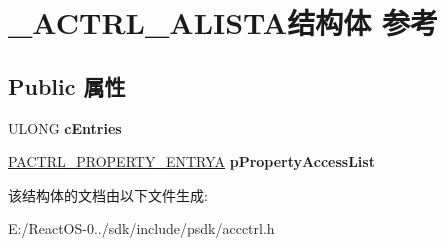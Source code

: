 \hypertarget{struct___a_c_t_r_l___a_l_i_s_t_a}{}\section{\+\_\+\+A\+C\+T\+R\+L\+\_\+\+A\+L\+I\+S\+T\+A结构体 参考}
\label{struct___a_c_t_r_l___a_l_i_s_t_a}
\subsection*{Public 属性}
\begin{DoxyCompactItemize}
\item 
\mbox{\label{struct___a_c_t_r_l___a_l_i_s_t_a_a98219313580ed691242f960f8d076cad}} 
U\+L\+O\+NG {\bfseries c\+Entries}
\item 
\mbox{\label{struct___a_c_t_r_l___a_l_i_s_t_a_a0926da45947604108cd636c1bd174a72}} 
\hyperlink{struct___a_c_t_r_l___p_r_o_p_e_r_t_y___e_n_t_r_y_a}{P\+A\+C\+T\+R\+L\+\_\+\+P\+R\+O\+P\+E\+R\+T\+Y\+\_\+\+E\+N\+T\+R\+YA} {\bfseries p\+Property\+Access\+List}
\end{DoxyCompactItemize}


该结构体的文档由以下文件生成\+:\begin{DoxyCompactItemize}
\item 
E\+:/\+React\+O\+S-\/0../sdk/include/psdk/accctrl.\+h\end{DoxyCompactItemize}
